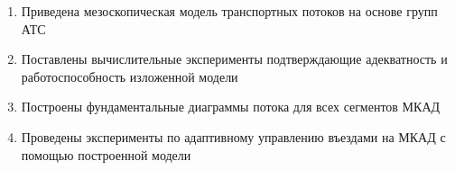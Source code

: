\begin{enumerate}
  \item Приведена мезоскопическая модель транспортных потоков на основе групп АТС
  \item Поставлены вычислительные эксперименты подтверждающие адекватность и работоспособность изложенной модели
  \item Построены фундаментальные диаграммы потока для всех сегментов МКАД
  \item Проведены эксперименты по адаптивному управлению въездами на МКАД с помощью построенной модели
\end{enumerate}
